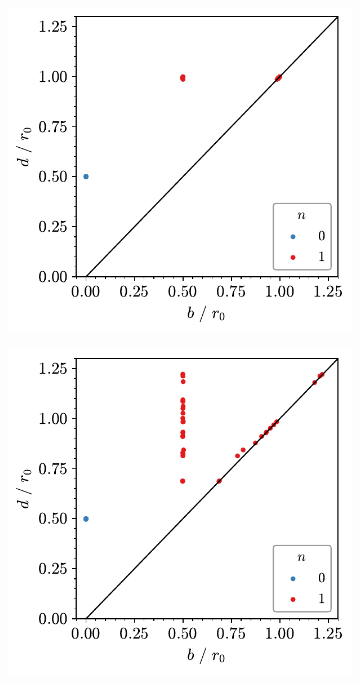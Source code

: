 \begin{figure}[tbp]
     \begin{subfigure}[b]{0.45\textwidth}
         \centering
         \includegraphics[width=\textwidth]{./figures/ph/ex_c_pd.pdf}
         \caption{}
         \label{fig:exvise}
     \end{subfigure}
     \hfill
     \begin{subfigure}[b]{0.45\textwidth}
         \centering
         \includegraphics[width=\textwidth]{./figures/ph/ex_a_pd.pdf}
         \caption{}
         \label{fig:exvisf}
     \end{subfigure}
     \hfill
    

\end{figure}
